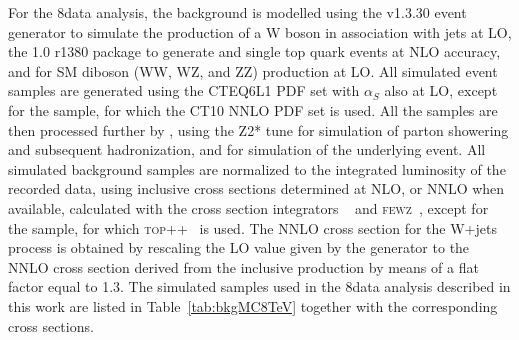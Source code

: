For the 8\TeV data analysis, the background is modelled using the  v1.3.30 event generator to simulate the production of a W boson in association with jets at LO,
the \POWHEG{} 1.0 r1380 package to generate \ttbar and single top quark events at NLO accuracy, and  for SM diboson (WW, WZ, and ZZ) production at LO.
All simulated event samples are generated using the CTEQ6L1 PDF set with $\alpha_S$ also at LO, except for the \POWHEG{} \ttbar sample,
for which the CT10 NNLO PDF set is used.
All the samples are then processed further by , using the Z2* tune for simulation of parton showering and subsequent hadronization,
and for simulation of the underlying event. All simulated background samples are normalized to the integrated luminosity of the recorded data, using inclusive cross sections determined at NLO,
or NNLO when available, calculated with the cross section integrators \MCFM{}~\cite{Campbell:2003hd,Campbell:2011bn,Campbell:2012uf,Campbell:2004ch}
and \textsc{fewz}~\cite{Li:2012wna}, except for the \ttbar sample, for which \textsc{top++}~\cite{Czakon:2011xx} is used.
The NNLO cross section for the W+jets process is obtained by rescaling the LO value given by the generator to the NNLO cross section
derived from the inclusive production by means of a flat factor equal to 1.3.
The simulated samples used in the 8\TeV data analysis described in this work are listed in Table~\ref{tab:bkgMC8TeV} together with the corresponding cross sections.\\


